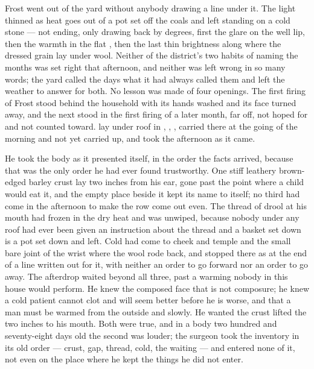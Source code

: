 Frost went out of the yard without anybody drawing a line under it. The light thinned as heat goes out of a pot set off the coals and left standing on a cold stone --- not ending, only drawing back by degrees, first the glare on the well lip, then the warmth in the flat , then the last thin brightness along  where the dressed grain lay under wool. Neither of the district's two habits of naming the months was set right that afternoon, and neither was left wrong in so many words; the yard called the days what it had always called them and left the weather to answer for both. No lesson was made of four openings. The first firing of Frost stood behind the household with its hands washed and its face turned away, and the next stood in the first firing of a later month, far off, not hoped for and not counted toward.  lay under  roof in , , , carried there at the going of the morning and not yet carried up, and took the afternoon as it came.

He took the body as it presented itself, in the order the facts arrived, because that was the only order he had ever found trustworthy. One stiff leathery brown-edged barley crust lay two inches from his ear, gone past the point where a child would eat it, and the empty place beside it kept its name to itself; no third had come in the afternoon to make the row come out even. The thread of drool at his mouth had frozen in the dry heat and was unwiped, because nobody under any roof had ever been given an instruction about the thread and a basket set down is a pot set down and left. Cold had come to cheek and temple and the small bare joint of the wrist where the wool rode back, and stopped there as at the end of a line written out for it, with neither an order to go forward nor an order to go away. The afterdrop waited beyond all three, past a warming nobody in this house would perform. He knew the composed face that is not composure; he knew a cold patient cannot clot and will seem better before he is worse, and that a man must be warmed from the outside and slowly. He wanted the crust lifted the two inches to his mouth. Both were true, and in a body two hundred and seventy-eight days old the second was louder; the surgeon took the inventory in its old order --- crust, gap, thread, cold, the waiting --- and entered none of it, not even on the place where he kept the things he did not enter.

